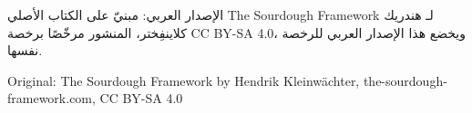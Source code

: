 {{\begin{flushleft}
الإصدار العربي: مبنيّ على الكتاب الأصلي \textenglish{The Sourdough Framework}
لـ هندريك كلاينفِختر، المنشور مرخّصًا برخصة \textenglish{CC BY-SA 4.0}،
ويخضع هذا الإصدار العربي للرخصة نفسها.
\end{flushleft}
}

{\centering\textenglish{Original: The Sourdough Framework by Hendrik
Kleinwächter, the-sourdough-framework.com, CC BY-SA 4.0}\par}
}
